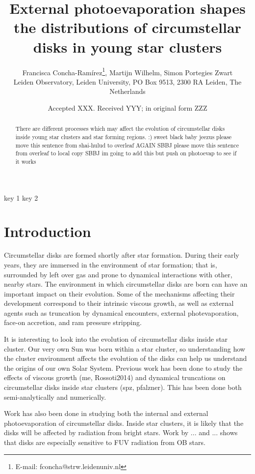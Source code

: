 \documentclass[fleqn,usenatbib]{mnras}
\title[External photoevaporation of disks in young star clusters]{External photoevaporation shapes the distributions of circumstellar disks in young star clusters}
\author[Concha-Ramírez et al.]{
Francisca Concha-Ramírez\thanks{E-mail: fconcha@strw.leidenuniv.nl},
Martijn Wilhelm,
Simon Portegies Zwart
\\
Leiden Observatory, Leiden University, PO Box 9513, 2300 RA Leiden, The Netherlands\\
}
\date{Accepted XXX. Received YYY; in original form ZZZ}
\begin{document}
\label{firstpage}
\pagerange{\pageref{firstpage}--\pageref{lastpage}}
\maketitle

\begin{abstract}
There are different processes which may affect the evolution of circumstellar disks inside young star clusters and star forming regions. :)
sweet black baby jeezus please move this sentence from shai-hulud to overleaf AGAIN
SBBJ please move this sentence from overleaf to local copy
SBBJ im going to add this but push on photoevap to see if it works
\end{abstract}

\begin{keywords}
key 1 key 2
\end{keywords}

\section{Introduction}
\label{sec:introduction}

Circumstellar disks are formed shortly after star formation. During their early years, they are immersed in the environment of star formation; that is, surrounded by left over gas and prone to dynamical interactions with other, nearby stars. 
The environment in which circumstellar disks are born can have an important impact on their evolution. Some of the mechanisms affecting their development correspond to their intrinsic viscous growth, as well as external agents such as truncation by dynamical encounters, external photevaporation, face-on accretion, and ram pressure stripping. 

It is interesting to look into the evolution of circumstellar disks inside star cluster. Our very own Sun was born within a star cluster, so understanding how the cluster environment affects the evolution of the disks can help us understand the origins of our own Solar System. Previous work has been done to study the effects of viscous growth (me, Rossoti2014) and dynamical truncations on circumstellar disks inside star clusters (spz, pfalzner). This has been done both semi-analytically and numerically. 

Work has also been done in studying both the internal and external photoevaporation of circumstellar disks. Inside star clusters, it is likely that the disks will be affected by radiation from bright stars. Work by ... and ... shows that disks are especially sensitive to FUV radiation from OB stars.
\end{document}
